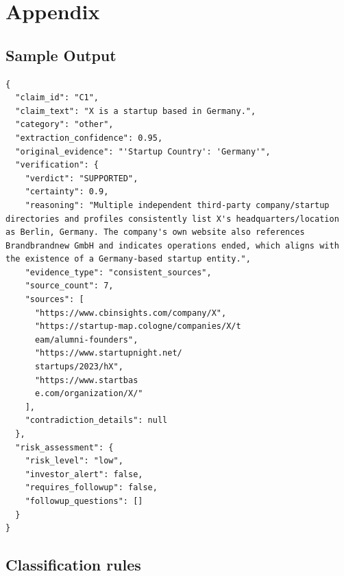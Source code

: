 \section{Appendix}

\subsection{Sample Output}
\label{appendix:sample_output}
\begin{verbatim}
{
  "claim_id": "C1",
  "claim_text": "X is a startup based in Germany.",
  "category": "other",
  "extraction_confidence": 0.95,
  "original_evidence": "'Startup Country': 'Germany'",
  "verification": {
    "verdict": "SUPPORTED",
    "certainty": 0.9,
    "reasoning": "Multiple independent third-party company/startup directories and profiles consistently list X's headquarters/location as Berlin, Germany. The company's own website also references Brandbrandnew GmbH and indicates operations ended, which aligns with the existence of a Germany-based startup entity.",
    "evidence_type": "consistent_sources",
    "source_count": 7,
    "sources": [
      "https://www.cbinsights.com/company/X",
      "https://startup-map.cologne/companies/X/t
      eam/alumni-founders",
      "https://www.startupnight.net/
      startups/2023/hX",
      "https://www.startbas
      e.com/organization/X/"
    ],
    "contradiction_details": null
  },
  "risk_assessment": {
    "risk_level": "low",
    "investor_alert": false,
    "requires_followup": false,
    "followup_questions": []
  }
}
\end{verbatim}




\subsection{Classification rules}
\label{appendix:classification_rules}

